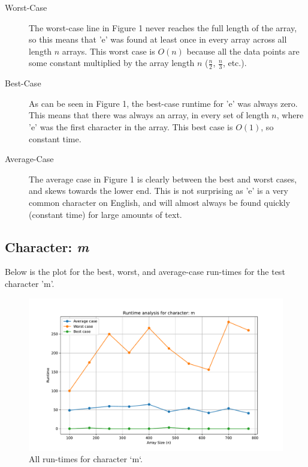 \documentclass{article}
\begin{document}
\begin{description}
    \item[Worst-Case] The worst-case line in Figure 1 never reaches the full length of the array, so this means that 'e' was found at least once in every array across all length $n$ arrays. This worst case is $O(n)$ because all the data points are some constant multiplied by the array length $n$ ($\frac{n}{2}$, $\frac{n}{3}$, etc.).
    \item[Best-Case] As can be seen in Figure 1, the best-case runtime for 'e' was always zero. This means that there was always an array, in every set of length $n$, where 'e' was the first character in the array. This best case is $O(1)$, so constant time. 
    \item[Average-Case] The average case in Figure 1 is clearly between the best and worst cases, and skews towards the lower end. This is not surprising as 'e' is a very common character on English, and will almost always be found quickly (constant time) for large amounts of text. 
\end{description}

\subsection{Character: \textit{m}}
Below is the plot for the best, worst, and average-case run-times for the test character 'm'.
	
	\begin{figure}[H]
		\centering
		\includegraphics[width=\textwidth]{runtime_analysis_m.pdf}
		\caption{All run-times for character `m`.}
	\end{figure}
\end{document}
